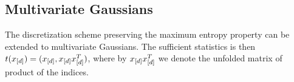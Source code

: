 \subsection{Multivariate Gaussians}

The discretization scheme preserving the maximum entropy property can be extended to multivariate Gaussians.
The sufficient statistics is then $t(x_{[d]})=(x_{[d]},x_{[d]}x_{[d]}^T)$, where by $x_{[d]}x_{[d]}^T$ we denote the unfolded matrix of product of the indices.